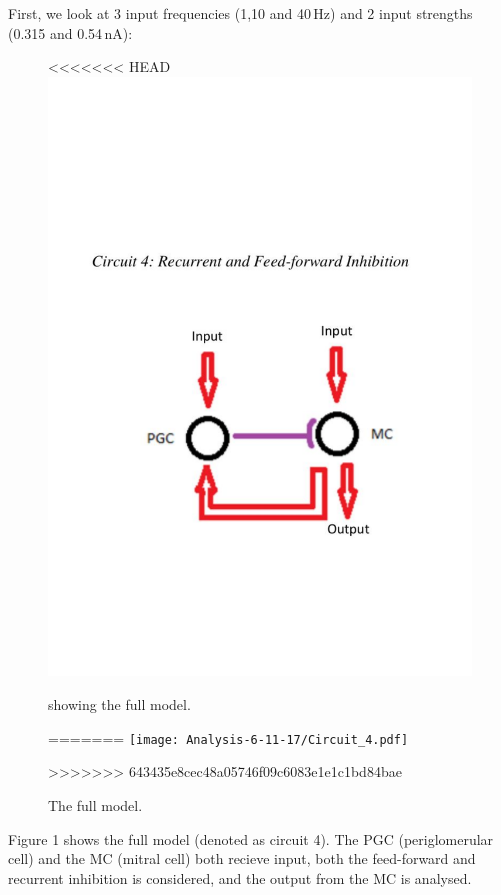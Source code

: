 \documentclass[11pt]{report}
\begin{document}
First, we look at 3 input frequencies (1,10 and 40\,Hz) and 2 input strengths (0.315 and 0.54\,nA):
\begin{figure}[!ht]
\centering
<<<<<<< HEAD
\includegraphics[trim={0 6cm 0 8cm},clip, scale=0.5]{images/2017-11-06/Circuit_4.pdf}
\caption{showing the full model.}
=======
\texttt{[image: Analysis-6-11-17/Circuit\_4.pdf]}
\caption{The full model.}
>>>>>>> 643435e8cec48a05746f09c6083e1e1c1bd84bae
\end{figure} 

Figure 1 shows the full model (denoted as circuit 4). The PGC (periglomerular cell) and the MC (mitral cell) both recieve input, both the feed-forward and recurrent inhibition is considered, and the output from the MC is analysed. 
\newpage
\end{document}
